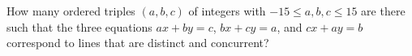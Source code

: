 How many ordered triples $(a,b,c)$ of integers with $-15\leq a,b,c\leq15$ are there such that the three equations $ax+by=c$, $bx+cy=a$, and $cx+ay=b$ correspond to lines that are distinct and concurrent?